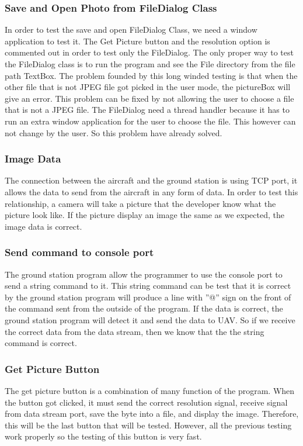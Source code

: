 \subsubsection{Save and Open Photo from FileDialog Class}
In order to test the save and open FileDialog Class, we need a window application to test it. The  Get Picture button and the resolution option is commented out in order to test only the FileDialog. The only proper way to test the FileDialog class is to run the program and see the File directory from the file path TextBox. The problem founded by this long winded testing is that when the other file that is not JPEG file got picked in the user mode, the pictureBox will give an error. This problem can be fixed by not allowing the user to choose a file that is not a JPEG file. The FileDialog need a thread handler because it has to run an extra window application for the user to choose the file. This however can not change by the user. So this problem have already solved.
\subsubsection{Image Data}
The connection between the aircraft and the ground station is using TCP port, it allows the data to send from the aircraft in any form of data. In order to test this relationship, a camera will take a picture that the developer know what the picture look like. If the picture display an image the same as we expected, the image data is correct. 
\subsubsection{Send command to console port}
The ground station program allow the programmer to use the console port to send a string command to it. This string command can be test that it is correct by the ground station program will produce a line with ''@'' sign on the front of the command sent from the outside of the program.
If the data is correct, the ground station program will detect it and send the data to UAV. So if we receive the correct data from the data stream, then we know that the the string command is correct.
\subsubsection{Get Picture Button}
The get picture button is a combination of many function of the program. When the button got clicked, it must send the correct resolution signal, receive signal from data stream port, save the byte into a file, and display the image. Therefore, this will be the last button that will be tested. However, all the previous testing work properly so the testing of this button is very fast.

